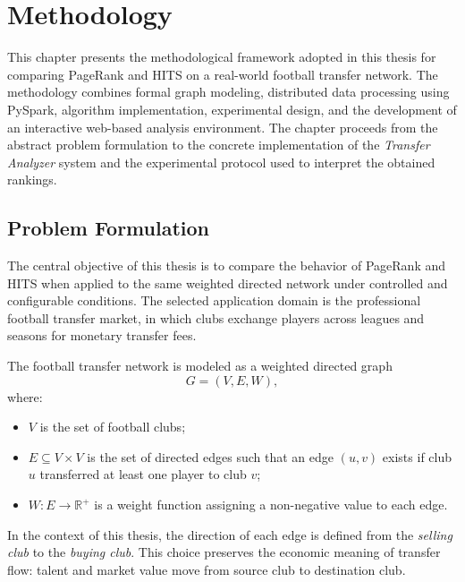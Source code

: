 \chapter{Methodology}
\label{ch:methodology}

This chapter presents the methodological framework adopted in this thesis for comparing PageRank and HITS on a real-world football transfer network. The methodology combines formal graph modeling, distributed data processing using PySpark, algorithm implementation, experimental design, and the development of an interactive web-based analysis environment. The chapter proceeds from the abstract problem formulation to the concrete implementation of the \textit{Transfer Analyzer} system and the experimental protocol used to interpret the obtained rankings.


\section{Problem Formulation}
\label{sec:problem_formulation}

The central objective of this thesis is to compare the behavior of PageRank and HITS when applied to the same weighted directed network under controlled and configurable conditions. The selected application domain is the professional football transfer market, in which clubs exchange players across leagues and seasons for monetary transfer fees.

\begin{definition}
The football transfer network is modeled as a weighted directed graph
\[
G = (V, E, W),
\]
where:
\begin{itemize}
    \item $V$ is the set of football clubs;
    \item $E \subseteq V \times V$ is the set of directed edges such that an edge $(u,v)$ exists if club $u$ transferred at least one player to club $v$;
    \item $W: E \rightarrow \mathbb{R}^{+}$ is a weight function assigning a non-negative value to each edge.
\end{itemize}
\end{definition}

In the context of this thesis, the direction of each edge is defined from the \textit{selling club} to the \textit{buying club}. This choice preserves the economic meaning of transfer flow: talent and market value move from source club to destination club.

